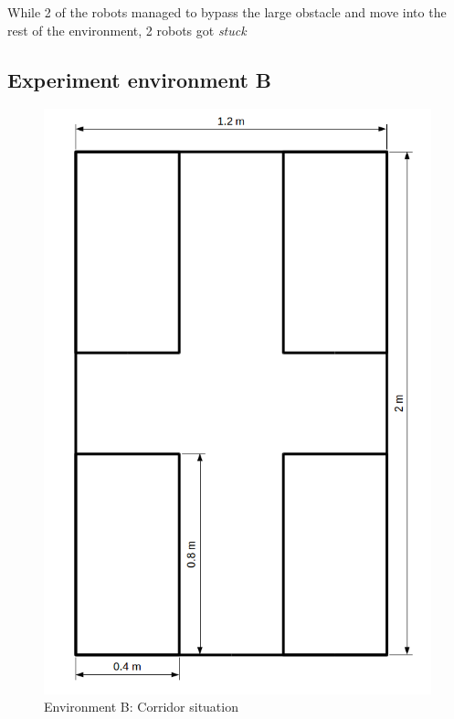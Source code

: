 While 2 of the robots managed to bypass the large obstacle and move into the rest of the environment, 2 robots got \textit{stuck}

\subsection{Experiment environment B}

\begin{figure}[h]
\centering
\includegraphics[scale=0.4]{Chapter4/images/experiment_2.png}
\caption{Environment B: Corridor situation}
\label{fig:experiment_b}
\end{figure}

